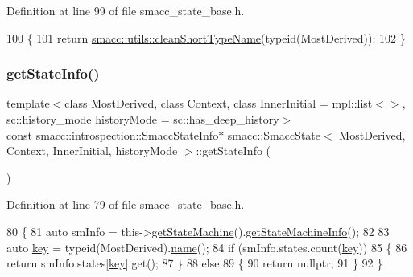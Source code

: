 Definition at line 99 of file smacc\+\_\+state\+\_\+base.\+h.


\begin{DoxyCode}
100   \{
101     \textcolor{keywordflow}{return} \hyperlink{namespacesmacc_1_1utils_aacd1975bb7cd9bec4b50e111a2ae7edb}{smacc::utils::cleanShortTypeName}(\textcolor{keyword}{typeid}(MostDerived));
102   \}
\end{DoxyCode}
\mbox{\label{classsmacc_1_1SmaccState_ab7825f5db39dcbee4e4384913026d3e2}} 
\subsubsection{\texorpdfstring{get\+State\+Info()}{getStateInfo()}}
{\footnotesize\ttfamily template$<$class Most\+Derived, class Context, class Inner\+Initial = mpl\+::list$<$$>$, sc\+::history\+\_\+mode history\+Mode = sc\+::has\+\_\+deep\+\_\+history$>$ \\
const \hyperlink{classsmacc_1_1introspection_1_1SmaccStateInfo}{smacc\+::introspection\+::\+Smacc\+State\+Info}$\ast$ \hyperlink{classsmacc_1_1SmaccState}{smacc\+::\+Smacc\+State}$<$ Most\+Derived, Context, Inner\+Initial, history\+Mode $>$\+::get\+State\+Info (\begin{DoxyParamCaption}{ }\end{DoxyParamCaption})\hspace{0.3cm}{\ttfamily [inline]}}



Definition at line 79 of file smacc\+\_\+state\+\_\+base.\+h.


\begin{DoxyCode}
80   \{
81     \textcolor{keyword}{auto} smInfo = this->\hyperlink{classsmacc_1_1SmaccState_afc39f8e0ca4001b2159a100da2fccd0e}{getStateMachine}().\hyperlink{classsmacc_1_1ISmaccStateMachine_a3b1facb0477325fe43b447fc21d9eb7d}{getStateMachineInfo}();
82 
83     \textcolor{keyword}{auto} \hyperlink{namespacekeyboard__server__node_af0ebd8a9e1564ddc13a227c727602466}{key} = \textcolor{keyword}{typeid}(MostDerived).\hyperlink{namespaceinteractive__marker_a447655961b3d3ca3c5a2a9d3d769436d}{name}();
84     \textcolor{keywordflow}{if} (smInfo.states.count(\hyperlink{namespacekeyboard__server__node_af0ebd8a9e1564ddc13a227c727602466}{key}))
85     \{
86       \textcolor{keywordflow}{return} smInfo.states[\hyperlink{namespacekeyboard__server__node_af0ebd8a9e1564ddc13a227c727602466}{key}].get();
87     \}
88     \textcolor{keywordflow}{else}
89     \{
90       \textcolor{keywordflow}{return} \textcolor{keyword}{nullptr};
91     \}
92   \}
\end{DoxyCode}
\mbox{\label{classsmacc_1_1SmaccState_afc39f8e0ca4001b2159a100da2fccd0e}} 
